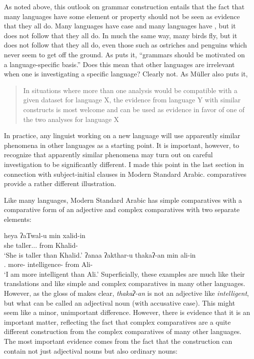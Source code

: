 \documentclass[output=paper]{langsci/langscibook}
\begin{document}
As noted above, this outlook on grammar construction entails that the fact that
many languages have some element or property should not be seen as evidence
that they all do. Many languages have case and many languages have
, but it does not follow that they all do. In much the same way,
many birds fly, but it does not follow that they all do, even those such as
ostriches and penguins which never seem to get off the ground. As
\citet[25]{Muller2015} puts it, \enquote{grammars should be motivated on a
    language-specific basis.} Does this mean that other languages are
    irrelevant when one is investigating a specific language?  Clearly not. As
    Müller also puts it, \blockquote[{\citealt[43]{Muller2015}}][.]{In
        situations where more than one analysis would be compatible with a
    given dataset for language X, the evidence from language Y with similar
constructs is most welcome and can be used as evidence in favor of one of the
two analyses for language X} In practice, any linguist working on a new
language will use apparently similar phenomena in other languages as a starting
point. It is important, however, to recognize that apparently similar phenomena
may turn out on careful investigation to be significantly different. I made
this point in the last section in connection with subject-initial clauses in
Modern Standard Arabic.   comparatives provide a rather different
illustration.

Like many languages, Modern Standard Arabic has simple comparatives with a comparative form of an
adjective and complex comparatives with two separate elements:


\ea\label{ex:borsley:4.34}
    \ea\label{ex:borsley:4.34a}
        \gll    heya    ʔaTwal-u           min    xalid-in\\
                she taller.\F.\Sg.\Nom{} from Khalid-\Gen{}\\
        \glt    \enquote*{She is taller than Khalid.}
    \ex\label{ex:borsley:4.34b}
        \gll    ʔanaa        ʔakthar-u    thakaʔ-an          min    ali-in\\
                \Fsg.\M{} more-\Nom{} intelligence-\Acc{} from Ali-\Gen{}\\
        \glt    \enquote*{I am more intelligent than Ali.}
    \z
\z
%
Superficially, these examples are much like their  translations
and like simple and complex comparatives in many other languages. However, as
the gloss of  makes clear, \emph{thakaʔ-an} is not an
adjective like \emph{intelligent}, but what can be called an adjectival noun
(with accusative case). This might seem like a minor, unimportant difference.
However, there is evidence that it is an important matter, reflecting the fact
that  complex comparatives are a quite different construction from
the complex comparatives of many other languages. The most important evidence
comes from the fact that the construction can contain not just adjectival nouns
but also ordinary nouns:
\end{document}
